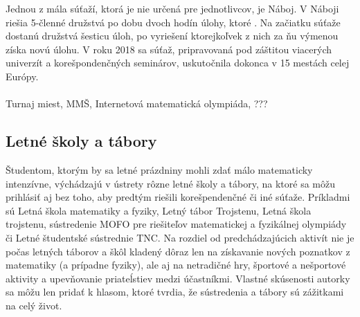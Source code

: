 \documentclass[11pt,a4paper,oneside,final]{book}
\begin{document}
Jednou z mála súťaží, ktorá je nie určená pre jednotlivcov, je Náboj. V Náboji riešia 5-členné družstvá po dobu dvoch hodín úlohy, ktoré . Na začiatku súťaže dostanú družstvá šesticu úloh, po vyriešení ktorejkoľvek z nich za ňu výmenou získa novú úlohu. V roku 2018 sa súťaž, pripravovaná pod záštitou viacerých univerzít a korešpondenčných seminárov, uskutočnila dokonca v 15 mestách celej Európy.\\
\\


Turnaj miest, MMŠ, Internetová matematická olympiáda, ???

\subsection*{Letné školy a tábory}

Študentom, ktorým by sa letné prázdniny mohli zdať málo matematicky intenzívne, výchádzajú v ústrety rôzne letné školy a tábory, na ktoré sa môžu prihlásiť aj bez toho, aby predtým riešili korešpendenčné či iné súťaže. Príkladmi sú Letná škola matematiky a fyziky, Letný tábor Trojstenu, Letná škola trojstenu, sústredenie MOFO pre riešiteľov matematickej a fyzikálnej olympiády či Letné študentské sústrednie TNC. Na rozdiel od predchádzajúcich aktivít nie je počas letných táborov a škôl kladený dôraz len na získavanie nových poznatkov z matematiky (a prípadne fyziky), ale aj na netradičné hry, športové a nešportové aktivity a upevňovanie priateĺstiev medzi účastníkmi. Vlastné skúsenosti autorky sa môžu len pridať k hlasom, ktoré tvrdia, že sústredenia a tábory sú zážitkami na celý život.
\end{document}
